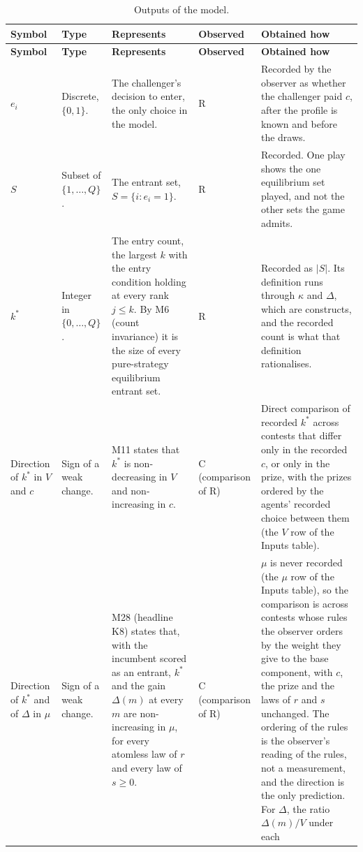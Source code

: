 \documentclass[11pt]{article}
\begin{document}
\footnotesize
\begin{longtable}{@{}P{1.9cm}P{2.4cm}P{4.5cm}P{1.7cm}P{4.7cm}@{}}
\caption{Outputs of the model.}\\
\toprule
\textbf{Symbol} & \textbf{Type} & \textbf{Represents} & \textbf{Observed} & \textbf{Obtained how} \\
\midrule
\endfirsthead
\toprule
\textbf{Symbol} & \textbf{Type} & \textbf{Represents} & \textbf{Observed} & \textbf{Obtained how} \\
\midrule
\endhead
\bottomrule
\endfoot
$e_i$ & Discrete, $\{0,1\}$. & The challenger's decision to enter, the only
  choice in the model. & R & Recorded by the observer as whether the challenger paid $c$, after the
  profile is known and before the draws. \\ \addlinespace
$S$ & Subset of $\{1,\dots,Q\}$. & The entrant set, $S=\{i:e_i=1\}$. & R & Recorded. One play shows the one equilibrium set played, and not the other
  sets the game admits. \\ \addlinespace
$k^*$ & Integer in $\{0,\dots,Q\}$. & The entry count, the largest $k$ with
  the entry condition holding at every rank $j\le k$. By M6 (count
  invariance) it is the size of every pure-strategy equilibrium entrant
  set. & R & Recorded as $|S|$. Its definition runs through $\kappa$ and $\Delta$,
  which are constructs, and the recorded count is what that definition
  rationalises. \\ \addlinespace
Direction of $k^*$ in $V$ and $c$ & Sign of a weak change. & M11 states that
  $k^*$ is non-decreasing in $V$ and non-increasing in $c$. & C (comparison of R) & Direct
  comparison of recorded $k^*$ across contests that differ only in the
  recorded $c$, or only in the prize, with the prizes ordered by the agents'
  recorded choice between them (the $V$ row of the Inputs table). \\ \addlinespace
Direction of $k^*$ and of $\Delta$ in $\mu$ & Sign of a weak change. & M28
  (headline K8) states that, with the incumbent scored as an entrant,
  $k^*$ and the gain $\Delta(m)$ at every $m$ are non-increasing in $\mu$, for
  every atomless law of $r$ and every law of $s\ge0$. & C (comparison of R) & $\mu$ is never recorded (the $\mu$ row of the Inputs
  table), so the comparison is across contests whose rules the observer
  orders by the weight they give to the base component, with $c$, the
  prize and the laws of $r$ and $s$ unchanged. The ordering of the rules is
  the observer's reading of the rules, not a measurement, and the direction
  is the only prediction. For $\Delta$, the ratio $\Delta(m)/V$ under each

\end{longtable}
\end{document}
